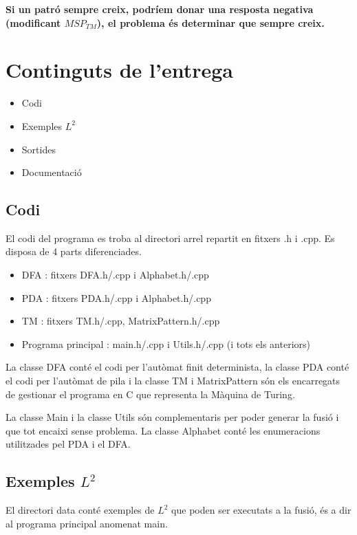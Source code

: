 \documentclass[12pt,a4paper]{report}
\def \tm{$MSP_{TM} $}
\begin{document}
\textbf{Si un patró sempre creix, podríem donar una resposta negativa (modificant \tm{}), el problema és determinar que sempre creix.}


\clearpage

\chapter{Continguts de l'entrega}

\begin{itemize}
\item Codi
\item Exemples $L^2$
\item Sortides
\item Documentació
\end{itemize}

\section{Codi}

El codi del programa es troba al directori arrel repartit en fitxers .h i .cpp. Es disposa de 4 parts diferenciades.

\begin{itemize}
\item DFA : fitxers DFA.h/.cpp i Alphabet.h/.cpp
\item PDA : fitxers PDA.h/.cpp i Alphabet.h/.cpp
\item TM : fitxers TM.h/.cpp, MatrixPattern.h/.cpp
\item Programa principal : main.h/.cpp i Utils.h/.cpp (i tots els anteriors)
\end{itemize}

La classe DFA conté el codi per l'autòmat finit determinista, la classe PDA conté el codi per l'autòmat de pila i la classe TM i MatrixPattern són els encarregats de gestionar el programa en C que representa la Màquina de Turing.

La classe Main i la classe Utils són complementaris per poder generar la fusió i que tot encaixi sense problema. La classe Alphabet conté les enumeracions utilitzades pel PDA i el DFA.

\section{Exemples $L^2$}

El directori data conté exemples de $L^2$ que poden ser executats a la fusió, és a dir al programa principal anomenat main.
\end{document}
